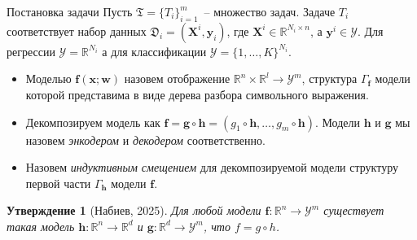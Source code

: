 \documentclass{beamer}
\newtheorem{statement}{Утверждение}
\begin{document}
\begin{frame}{Постановка задачи}
Пусть \(\mathfrak{T} = \{T_i\}_{i=1}^m\)~-- множество задач. Задаче \(T_i\) соответствует набор данных \( \mathfrak{D}_i = (\mathbf{X}^i, \mathbf{y}_i) \), где \(\mathbf{X}^i \in \mathbb{R}^{N_i \times n}\),  а \(\mathbf{y}^i \in \mathcal{Y}\). Для регрессии \(\mathcal{Y} =  \mathbb{R}^{N_i}\) а для классификации \(\mathcal{Y} =  \{1, \dots, K\}^{N_i}\).
\begin{itemize}
    \item Моделью \(\mathbf{f}(\mathbf{x}; \mathbf{w})\) назовем отображение \(\mathbb{R}^n \times \mathbb{R}^l \rightarrow \mathcal{Y}^m\), структура \(\Gamma_{\mathbf{f}}\) модели которой представима в виде дерева разбора символьного выражения. 
    \item Декомпозируем модель как \(\mathbf{f} = \mathbf{g} \circ \mathbf{h} = (g_1 \circ \mathbf{h}, \dots, g_m \circ \mathbf{h})\). Модели \(\mathbf{h}\) и \(\mathbf{g}\) мы назовем \textit{энкодером} и \textit{декодером} соответственно.
    \item Назовем \textit{индуктивным смещением} для декомпозируемой модели структуру первой части \(\Gamma_{\mathbf{h}}\) модели \(\mathbf{f}\).
\end{itemize}

\begin{statement}[Набиев, 2025]
    Для любой модели $\mathbf{f}: \mathbb{R}^n \to \mathcal{Y}^m$ существует такая модель $\mathbf{h}: \mathbb{R}^n \to \mathbb{R}^d$ и $\mathbf{g}: \mathbb{R}^d \to \mathcal{Y}^m$, что $f = g \circ h$.
\end{statement}
\end{frame}
\end{document}
